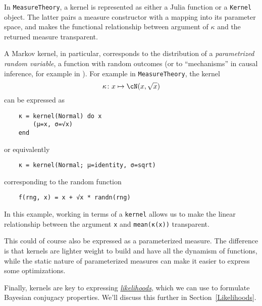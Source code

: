 \documentclass{juliacon}
\newcommand{\chad}[2][] {\todo[inline,backgroundcolor=orange!20!white, size=\footnotesize,#1]{(Chad) #2 }}
\newcommand{\moritz}[2][] {\todo[inline,backgroundcolor=blue!10!white, size=\footnotesize,#1]{(Moritz) #2 }}
\begin{document}
In \verb|MeasureTheory|, a kernel is represented as either a Julia function or a \verb|Kernel| object. The latter pairs a measure constructor with a mapping into its parameter space, and makes the functional relationship between argument of $\kappa$ and the returned measure transparent.

A Markov kernel, in particular, corresponds to the distribution of a \emph{parametrized random variable}, a function with random outcomes (or to ``mechanisms'' in causal inference, for example in \cite{https://doi.org/10.5281/zenodo.1005091}). For example in \verb|MeasureTheory|, the kernel
\[
\kappa\colon x \mapsto \cN(x,\sqrt{x})
\]
can be expressed as
\begin{verbatim}
    κ = kernel(Normal) do x
        (μ=x, σ=√x)
    end
\end{verbatim}
or equivalently
\begin{verbatim}
    κ = kernel(Normal; μ=identity, σ=sqrt)
\end{verbatim}
corresponding to the random function
\begin{verbatim}
    f(rng, x) = x + √x * randn(rng)
\end{verbatim}

In this example, working in terms of a \verb|kernel| allows us to make the linear relationship between the argument \verb|x| and \verb|mean(κ(x))| transparent. 

This could of course also be expressed as a parameterized measure. The difference is that kernels are lighter weight to build and have all the dynamism of functions, while the static nature of parameterized measures can make it easier to express some optimizations.


Finally, kernels are key to expressing \href{https://en.wikipedia.org/wiki/Likelihood_function}{\emph{likelihoods}}, which we can use to formulate Bayesian conjugacy properties. We'll discuss this further in Section~\ref{Likelihoods}.


\end{document}
